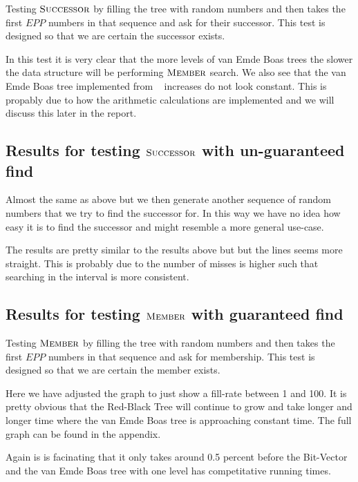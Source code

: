 \documentclass[oneside,11pt,openright]{report}
\newcommand{\Member}{\textsc{Member}}
\newcommand{\Successor}{\textsc{Successor}}
\begin{document}
Testing $\Successor$ by filling the tree with random numbers and then takes the first $EPP$ numbers in that sequence and ask for their successor. This test is designed so that we are certain the successor exists.



In this test it is very clear that the more levels of van Emde Boas trees the slower the data structure will be performing $\Member$ search. We also see that the van Emde Boas tree implemented from ~\cite{ITA09} increases do not look constant. This is propably due to how the arithmetic calculations are implemented and we will discuss this later in the report.

\subsection{Results for testing $\Successor$ with un-guaranteed find}

Almost the same as above but we then generate another sequence of random numbers that we try to find the successor for. In this way we have no idea how easy it is to find the successor and might resemble a more general use-case.



The results are pretty similar to the results above but but the lines seems more straight. This is probably due to the number of misses is higher such that searching in the interval is more consistent.

\subsection{Results for testing $\Member$ with guaranteed find}

Testing $\Member$ by filling the tree with random numbers and then takes the first $EPP$ numbers in that sequence and ask for membership. This test is designed so that we are certain the member exists.



Here we have adjusted the graph to just show a fill-rate between 1 and 100. It is pretty obvious that the Red-Black Tree will continue to grow and take longer and longer time where the van Emde Boas tree is approaching constant time. The full graph can be found in the appendix.

Again is is facinating that it only takes around 0.5 percent before the Bit-Vector and the van Emde Boas tree with one level has competitative running times.
\end{document}
